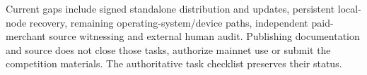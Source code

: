 Current gaps include signed standalone distribution and updates, persistent local-node recovery, remaining operating-system/device paths, independent paid-merchant source witnessing and external human audit. Publishing documentation and source does not close those tasks, authorize mainnet use or submit the competition materials. The authoritative task checklist preserves their status.
